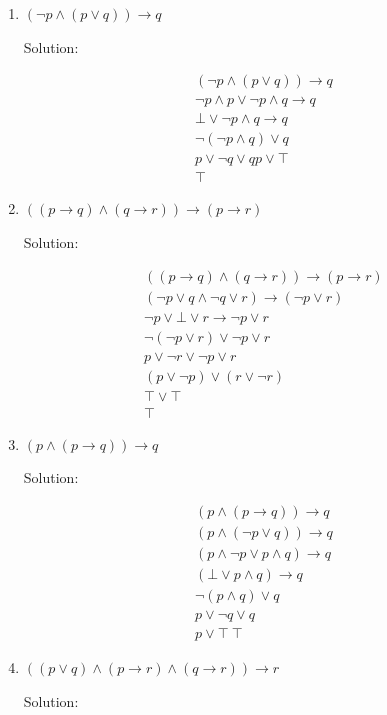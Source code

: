 \documentclass[11pt]{article}
\begin{document}
\begin{enumerate}
\item \((\neg p \land (p \lor q)) \to q\)

Solution:

\begin{align}
(\neg p \land (p \lor q)) \to q \\
\neg p \land p \lor \neg p \land q \to q \\
\bot \lor \neg p \land q \to q \\
\neg ( \neg p \land q ) \lor q \\
p \lor \neg q \lor q
p \lor \top \\
\top
\end{align}

\item \(((p\to q) \land (q\to r)) \to (p \to r)\)

Solution:

\begin{align}
((p\to q) \land (q\to r)) \to (p \to r) \\
(\neg p \lor q \land \neg q \lor r) \to (\neg p \lor r) \\
\neg p \lor \bot \lor r \to \neg p \lor r \\
\neg ( \neg p \lor r ) \lor \neg p \lor r \\
p \lor \neg r \lor \neg p \lor r \\
(p \lor \neg p) \lor (r \lor \neg r) \\
\top \lor \top \\
\top
\end{align}

\item \((p \land (p \to q)) \to q\)

Solution:

\begin{align}
 (p \land (p \to q)) \to q \\
 (p \land (\neg p \lor q)) \to q \\
 (p \land \neg p \lor p \land q) \to q \\
 (\bot \lor p \land q) \to q \\
 \neg (p \land q) \lor q \\
 p \lor \neg q \lor q \\
 p \lor \top \
 \top
\end{align}

\item \(((p\lor q) \land (p \to r) \land (q \to r)) \to r\)

Solution:


\end{enumerate}
\end{document}
